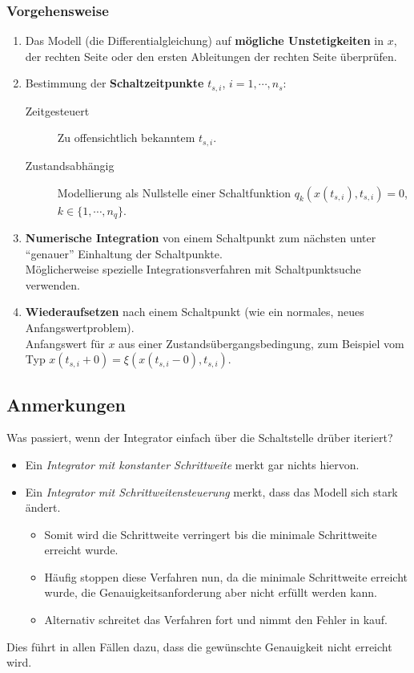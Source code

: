 			\subsubsection{Vorgehensweise} %
				\begin{enumerate}
					\item Das Modell (die Differentialgleichung) auf \textbf{mögliche Unstetigkeiten} in \(x\), der rechten Seite oder den ersten Ableitungen der rechten Seite überprüfen.
					\item Bestimmung der \textbf{Schaltzeitpunkte} \( t _ {s,i} \), \( i = 1, \cdots, n _ s \):
						\begin{description}
							\item[Zeitgesteuert] Zu offensichtlich bekanntem \( t _ { s, i } \).
							\item[Zustandsabhängig] Modellierung als Nullstelle einer Schaltfunktion \( q _ k (x(t _ { s, i }), t _ { s, i }) = 0 \), \( k \in \{ 1, \cdots, n _ q \} \).
						\end{description}
					\item \textbf{Numerische Integration} von einem Schaltpunkt zum nächsten unter \enquote{genauer} Einhaltung der Schaltpunkte. \\ Möglicherweise spezielle Integrationsverfahren mit Schaltpunktsuche verwenden.
					\item \textbf{Wiederaufsetzen} nach einem Schaltpunkt (wie ein normales, neues Anfangswertproblem). \\ Anfangswert für \(x\) aus einer Zustandsübergangsbedingung, zum Beispiel vom Typ \( x(t _ { s, i } + 0) = \xi(x(t _ { s, i } - 0), t _ { s, i }) \).
				\end{enumerate}

		\subsection{Anmerkungen} %
			Was passiert, wenn der Integrator einfach über die Schaltstelle drüber iteriert?
			\begin{itemize}
				\item Ein \textit{Integrator mit konstanter Schrittweite} merkt gar nichts hiervon.
				\item Ein \textit{Integrator mit Schrittweitensteuerung} merkt, dass das Modell sich stark ändert.
					\begin{itemize}
						\item Somit wird die Schrittweite verringert bis die minimale Schrittweite erreicht wurde.
						\item Häufig stoppen diese Verfahren nun, da die minimale Schrittweite erreicht wurde, die Genauigkeitsanforderung aber nicht erfüllt werden kann.
						\item Alternativ schreitet das Verfahren fort und nimmt den Fehler in kauf.
					\end{itemize}
			\end{itemize}
			Dies führt in allen Fällen dazu, dass die gewünschte Genauigkeit nicht erreicht wird.

